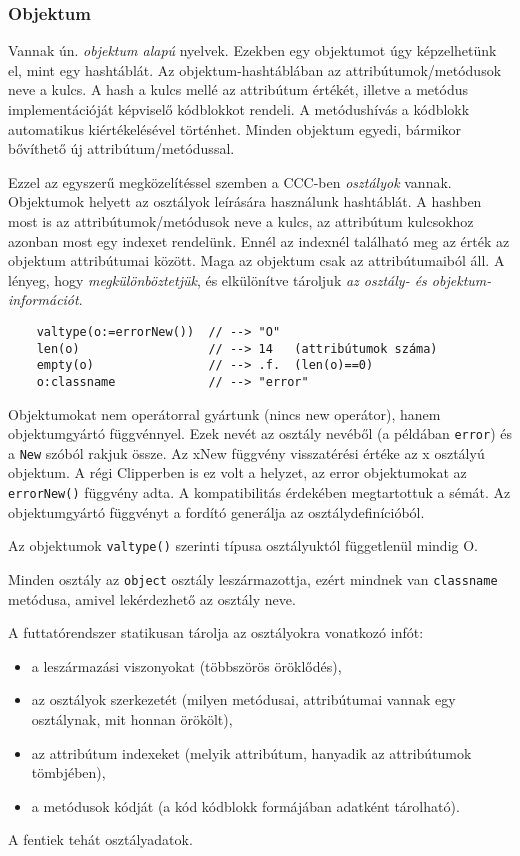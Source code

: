 \subsubsection{Objektum}

Vannak ún. {\em  objektum alapú\/} nyelvek.
Ezekben egy objektumot úgy képzelhetünk el, mint egy hashtáblát.
Az objektum-hashtáblában az attribútumok/metódusok neve a kulcs.
A hash a kulcs mellé az attribútum értékét, illetve a metódus
implementációját képviselő kódblokkot rendeli. A metódushívás
a kódblokk automatikus kiértékelésével történhet. Minden objektum
egyedi, bármikor bővíthető új attribútum/metódussal.

Ezzel az egyszerű megközelítéssel szemben a CCC-ben {\em osztályok\/} vannak.
Objektumok helyett  az osztályok leírására használunk hashtáblát.
A hashben most is az attribútumok/metódusok neve a kulcs,
az attribútum kulcsokhoz azonban most egy indexet rendelünk.
Ennél az indexnél található meg az érték az objektum attribútumai között.
Maga az objektum csak az attribútumaiból áll. 
A lényeg, hogy {\em megkülönböztetjük}, és elkülönítve tároljuk {\em az osztály- 
és objektum-információt}.


\begin{verbatim}
    valtype(o:=errorNew())  // --> "O"
    len(o)                  // --> 14   (attribútumok száma)
    empty(o)                // --> .f.  (len(o)==0)
    o:classname             // --> "error"
\end{verbatim}

Objektumokat nem operátorral gyártunk
(nincs new operátor), hanem objektumgyártó függvénnyel.
Ezek nevét az osztály nevéből (a példában \verb!error!) 
és a \verb!New! szóból rakjuk össze. 
Az xNew függvény visszatérési értéke az x osztályú
objektum. A régi Clipperben is ez volt a helyzet, az error objektumokat 
az \verb!errorNew()! függvény adta. A kompatibilitás érdekében megtartottuk
a sémát. Az objektumgyártó függvényt a fordító generálja az osztálydefinícióból.

Az objektumok \verb!valtype()! szerinti típusa osztályuktól 
függetlenül mindig O. 

Minden osztály az \verb!object! osztály leszármazottja, ezért mindnek
van \verb!classname! metódusa, amivel lekérdezhető az osztály neve.


A futtatórendszer statikusan tárolja az osztályokra vonatkozó infót:
\begin{itemize}
  \item a leszármazási viszonyokat (többszörös öröklődés),
  \item az osztályok szerkezetét
        (milyen metódusai, attribútumai vannak egy osztálynak, 
        mit honnan örökölt),
  \item az attribútum indexeket (melyik attribútum, hanyadik az attribútumok tömbjében),
  \item a metódusok kódját (a kód kódblokk formájában adatként tárolható).
\end{itemize}
A fentiek tehát osztályadatok. 

